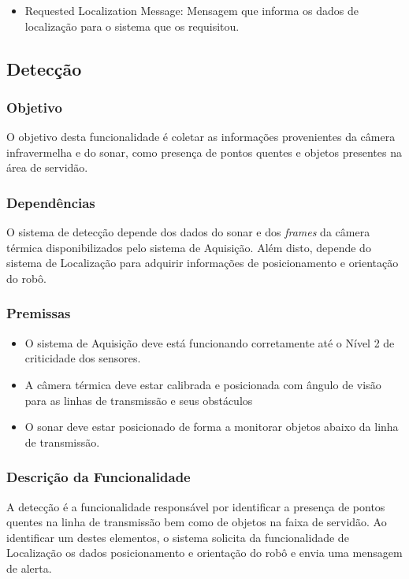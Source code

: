 \begin{itemize}
	\item Requested Localization Message: Mensagem que informa os dados de localização para o sistema que os requisitou.
\end{itemize}

\subsection{Detecção}
\label{ssec:func3}

\subsubsection{Objetivo}

O objetivo desta funcionalidade é coletar as informações provenientes da câmera infravermelha e do sonar, como presença de pontos quentes e objetos presentes na área de servidão. 

\subsubsection{Dependências}
O sistema de detecção depende dos dados do sonar e dos \textit{frames} da câmera térmica disponibilizados pelo sistema de Aquisição. Além disto, depende do sistema de Localização para adquirir informações de posicionamento e orientação do robô.

\subsubsection{Premissas}
\begin{itemize}
	\item O sistema de Aquisição deve está funcionando corretamente até o Nível 2 de criticidade dos sensores.
	\item A câmera térmica deve estar calibrada e posicionada com ângulo de visão para as linhas de transmissão e seus obstáculos
	\item O sonar deve estar posicionado de forma a monitorar objetos abaixo da linha de transmissão.            
\end{itemize}

\subsubsection{Descrição da Funcionalidade}

A detecção é a funcionalidade responsável por identificar a presença de pontos quentes na linha de transmissão bem como de objetos na faixa de servidão. Ao identificar um destes elementos, o sistema solicita da funcionalidade de Localização os dados posicionamento e orientação do robô e envia uma mensagem de alerta.

